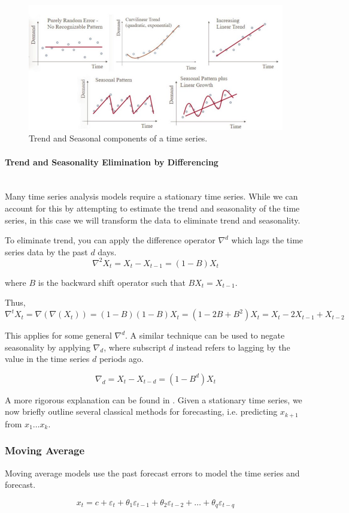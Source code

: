 \documentclass[12pt]{article}
\newcommand{\subsubsubsection}[1]{\paragraph{#1}\mbox{}\\}
\begin{document}
\begin{figure}[ht]
	\centering
	\includegraphics[width=.75\textwidth]{trend.jpeg}
	\caption{Trend and Seasonal components of a time series. \cite{trend}}
	\label{trends}
\end{figure}

\subsubsubsection{Trend and Seasonality Elimination by Differencing}

Many time series analysis models require a stationary time series. While we can account for this by attempting to estimate the trend and seasonality of the time series, in this case we will transform the data to eliminate trend and seasonality.

To eliminate trend, you can apply the difference operator $\nabla^d$ which lags the time series data by the past $d$ days.
$$\nabla^2 X_t = X_t - X_{t-1}=(1-B)X_t$$

where $B$ is the backward shift operator such that $BX_t = X_{t-1}$.

Thus, $$\nabla^t X_t = \nabla(\nabla(X_t)) = (1-B)(1-B)X_t = (1-2B+B^2)X_t = X_t-2X_{t-1}+X_{t-2}$$

This applies for some general $\nabla^d$. A similar technique can be used to negate seasonality by applying $\nabla_d$, where subscript $d$ instead refers to lagging by the value in the time series $d$ periods ago.

$$\nabla_d = X_t - X_{t-d} = (1-B^d) X_t$$

A more rigorous explanation can be found in \cite[22-32]{timeseries}. Given a stationary time series, we now briefly outline several classical methods for forecasting, i.e. predicting $x_{k+1}$ from $x_1 \dots x_k.$

\subsubsection{Moving Average}
Moving average models use the past forecast errors to model the time series and forecast. 

$$ x_{t} = c + \varepsilon_t + \theta_{1}\varepsilon_{t-1} + \theta_{2}\varepsilon_{t-2} + \dots + \theta_{q}\varepsilon_{t-q}$$
\end{document}
